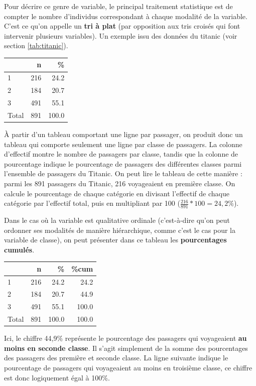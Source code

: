 \documentclass[
]{book}
\begin{document}
Pour décrire ce genre de variable, le principal traitement statistique est de compter le nombre d'individus correspondant à chaque modalité de la variable. C'est ce qu'on appelle un \textbf{tri à plat} (par opposition aux tris croisés qui font intervenir plusieurs variables). Un exemple issu des données du titanic (voir section \ref{tab:titanic}).

\begin{tabular}{l|r|r}
\hline
  & n & \%\\
\hline
1 & 216 & 24.2\\
\hline
2 & 184 & 20.7\\
\hline
3 & 491 & 55.1\\
\hline
Total & 891 & 100.0\\
\hline
\end{tabular}

À partir d'un tableau comportant une ligne par passager, on produit donc un tableau qui comporte seulement une ligne par classe de passagers. La colonne d'effectif montre le nombre de passagers par classe, tandis que la colonne de pourcentage indique le pourcentage de passagers des différentes classes parmi l'ensemble de passagers du Titanic. On peut lire le tableau de cette manière : parmi les 891 passagers du Titanic, 216 voyageaient en première classe. On calcule le pourcentage de chaque catégorie en divisant l'effectif de chaque catégorie par l'effectif total, puis en multipliant par 100 (\(\frac{216}{891}*100 = 24,2 \%\)).

Dans le cas où la variable est qualitative ordinale (c'est-à-dire qu'on peut ordonner ses modalités de manière hiérarchique, comme c'est le cas pour la variable de classe), on peut présenter dans ce tableau les \textbf{pourcentages cumulés}.

\begin{tabular}{l|r|r|r}
\hline
  & n & \% & \%cum\\
\hline
1 & 216 & 24.2 & 24.2\\
\hline
2 & 184 & 20.7 & 44.9\\
\hline
3 & 491 & 55.1 & 100.0\\
\hline
Total & 891 & 100.0 & 100.0\\
\hline
\end{tabular}

Ici, le chiffre 44,9\% représente le pourcentage des passagers qui voyageaient \textbf{au moins en seconde classe}. Il s'agit simplement de la somme des pourcentages des passagers des première et seconde classe. La ligne suivante indique le pourcentage de passagers qui voyageaient au moins en troisième classe, ce chiffre est donc logiquement égal à 100\%.
\end{document}
